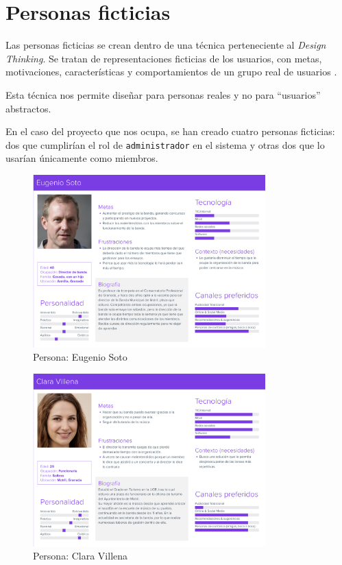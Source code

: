 \section{Personas ficticias}\label{section:personasFicticias}

Las personas ficticias se crean dentro de una técnica perteneciente al \textit{Design Thinking}. Se tratan de representaciones ficticias de los usuarios, con metas, motivaciones, características y comportamientos de un grupo real de usuarios \cite{personnas}.

Esta técnica nos permite diseñar para personas reales y no para ``usuarios'' abstractos.

En el caso del proyecto que nos ocupa, se han creado cuatro personas ficticias: dos que cumplirían el rol de \texttt{administrador} en el sistema y otras dos que lo usarían únicamente como miembros.

\begin{figure}[h]
\centering
\includegraphics[width=0.8\textwidth]{imagenes/personas/persona_eugenio.png}
\caption{Persona: Eugenio Soto}
\label{fig:persona_eugenio}
\end{figure}

\begin{figure}[h]
\centering
\includegraphics[width=0.8\textwidth]{imagenes/personas/persona_clara.png}
\caption{Persona: Clara Villena}
\label{fig:persona_clara}
\end{figure}


